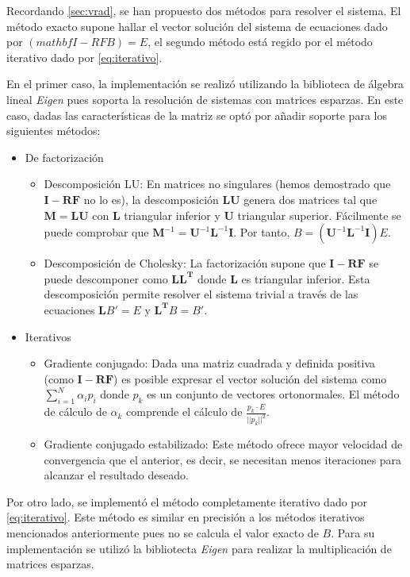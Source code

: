 Recordando \ref{sec:vrad}, se han propuesto dos métodos para resolver el sistema. El método exacto supone hallar el vector solución del sistema de ecuaciones dado por $(mathbf{I - RF}B) = E$, el segundo método está regido por el método iterativo dado por \eqref{eq:iterativo}.

En el primer caso, la implementación se realizó utilizando la biblioteca de álgebra lineal \textit{Eigen} pues soporta la resolución de sistemas con matrices esparzas. En este caso, dadas las características de la matriz se optó por añadir soporte para los siguientes métodos:

\begin{itemize}
	\item{De factorización}
		\begin{itemize}
			\item{Descomposición LU:} En matrices no singulares (hemos demostrado que $\mathbf{I - RF}$ no lo es), la descomposición $\mathbf{LU}$ genera dos matrices tal que $\mathbf{M} = \mathbf{LU}$ con $\mathbf{L}$ triangular inferior y $\mathbf{U}$ triangular superior. Fácilmente se puede comprobar que  $\mathbf{M}^{-1} = \mathbf{U}^{-1} \mathbf{L}^{-1} \mathbf{I}$. Por tanto, $B =(\mathbf{U}^{-1} \mathbf{L}^{-1} \mathbf{I})E$. 
			\item{Descomposición de Cholesky:} La factorización supone que  $\mathbf{I - RF}$ se puede descomponer como  $\mathbf{LL^{T}}$ donde  $\mathbf{L}$ es triangular inferior. Esta descomposición permite resolver el sistema trivial a través de las ecuaciones $\mathbf{L}B' = E$ y $\mathbf{L^{T}}B = B'$.
			\end{itemize}
	\item{Iterativos}
			\begin{itemize}
			\item Gradiente conjugado:
				Dada una matriz cuadrada y definida positiva (como $\mathbf{I - RF}$) es posible expresar el vector solución del sistema como $\sum_{i=1}^{N} \alpha_{i}p_{i}$ donde $p_{k}$ es un conjunto de vectores ortonormales. El método de cálculo de $\alpha_{k}$ comprende el cálculo de $\frac{p_{k} \cdot E}{||p_{k}||^{2}}$.			\item Gradiente conjugado estabilizado: Este método ofrece mayor velocidad de convergencia que el anterior, es decir, se necesitan menos iteraciones para alcanzar el resultado deseado. 
		\end{itemize}
\end{itemize}

Por otro lado, se implementó el método completamente iterativo dado por \eqref{eq:iterativo}. Este método es similar en precisión a los métodos iterativos  mencionados anteriormente pues no se calcula el valor exacto de $B$. Para su implementación se utilizó la bibliotecta \textit{Eigen} para realizar la multiplicación de matrices esparzas.

